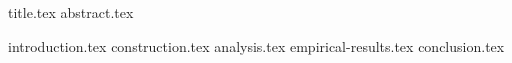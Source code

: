 \documentclass[11pt]{llncs}
\begin{document}
{title.tex}
\thispagestyle{plain}
{abstract.tex}

{introduction.tex}
{construction.tex}
{analysis.tex}
{empirical-results.tex}
{conclusion.tex}


\end{document}
